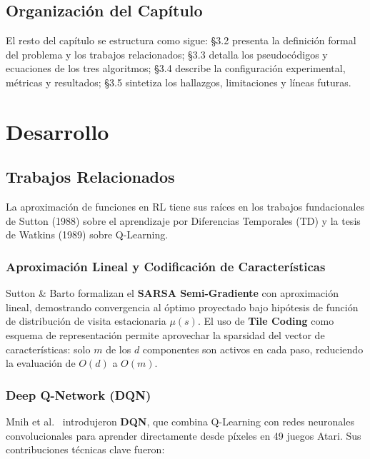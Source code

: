 \subsection{Organización del Capítulo}

El resto del capítulo se estructura como sigue: \S3.2 presenta la definición formal del problema y los trabajos relacionados; \S3.3 detalla los pseudocódigos y ecuaciones de los tres algoritmos; \S3.4 describe la configuración experimental, métricas y resultados; \S3.5 sintetiza los hallazgos, limitaciones y líneas futuras.

\section{Desarrollo}

\subsection{Trabajos Relacionados}

La aproximación de funciones en RL tiene sus raíces en los trabajos fundacionales de Sutton (1988) sobre el aprendizaje por Diferencias Temporales (TD) y la tesis de Watkins (1989) sobre Q-Learning.

\subsubsection{Aproximación Lineal y Codificación de Características}

Sutton \& Barto \cite{Sutton2018} formalizan el \textbf{SARSA Semi-Gradiente} con aproximación lineal, demostrando convergencia al óptimo proyectado bajo hipótesis de función de distribución de visita estacionaria $\mu(s)$. El uso de \textbf{Tile Coding} \cite{Sutton1996} como esquema de representación permite aprovechar la sparsidad del vector de características: solo $m$ de los $d$ componentes son activos en cada paso, reduciendo la evaluación de $O(d)$ a $O(m)$.

\subsubsection{Deep Q-Network (DQN)}

Mnih et al.~\cite{Mnih2015} introdujeron \textbf{DQN}, que combina Q-Learning con redes neuronales convolucionales para aprender directamente desde píxeles en 49 juegos Atari. Sus contribuciones técnicas clave fueron:

